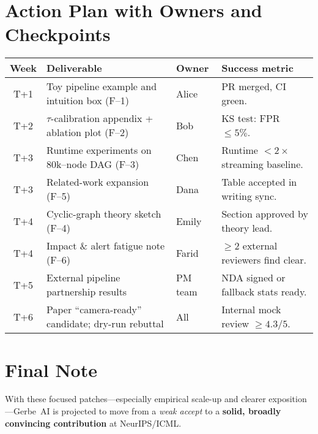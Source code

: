 \documentclass{article}
\begin{document}
\section{Action Plan with Owners and Checkpoints}
\begin{longtable}{@{}c L{3.8cm} L{3.2cm} L{4.0cm}@{}}
\toprule
\textbf{Week} & \textbf{Deliverable} & \textbf{Owner} & \textbf{Success metric} \\
\midrule
\endhead
T+1 & Toy pipeline example and intuition box (F--1) & Alice & PR merged, CI green. \\
T+2 & \(\tau\)-calibration appendix + ablation plot (F--2) & Bob & KS test: FPR \(\le 5\%\). \\
T+3 & Runtime experiments on 80k--node DAG (F--3) & Chen & Runtime \(< 2\times\) streaming baseline. \\
T+3 & Related\hyp work expansion (F--5) & Dana & Table accepted in writing sync. \\
T+4 & Cyclic\hyp graph theory sketch (F--4) & Emily & Section approved by theory lead. \\
T+4 & Impact \& alert fatigue note (F--6) & Farid & \(\ge\)2 external reviewers find clear. \\
T+5 & External pipeline partnership results & PM team & NDA signed or fallback stats ready. \\
T+6 & Paper ``camera\hyp ready'' candidate; dry\hyp run rebuttal & All & Internal mock review \(\ge 4.3/5\). \\
\bottomrule
\end{longtable}

\section*{Final Note}
With these focused patches---especially empirical scale\hyp up and clearer exposition---Gerbe~AI is projected to move from a \emph{weak accept} to a \textbf{solid, broadly convincing contribution} at NeurIPS/ICML.
\end{document}

